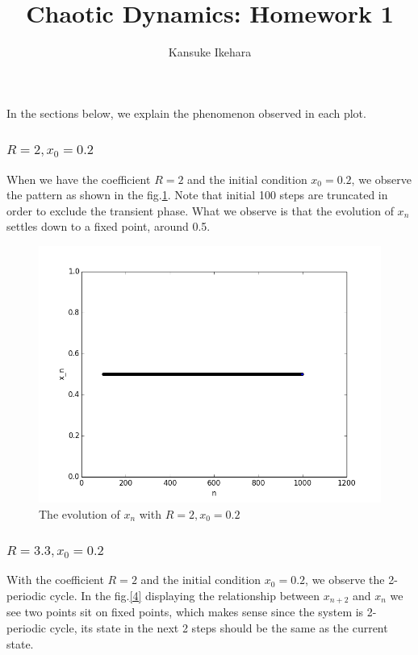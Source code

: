 \documentclass{article}
\title{Chaotic Dynamics: Homework 1}
\author{Kansuke Ikehara}
\begin{document}
\maketitle

In the sections below, we explain the phenomenon observed in each plot.
\subsubsection*{$R = 2, x_{0} = 0.2$}

When we have the coefficient $R = 2$ and the initial condition $x_{0} = 0.2$, we observe the pattern as shown in the fig.\ref{1}. Note that initial 100 steps are truncated in order to exclude the transient phase. What we observe is that the evolution of $x_{n}$ settles down to a fixed point, around 0.5.
\begin{figure}
	\centering
	\includegraphics[scale = 0.4]{figs/R2_x0_02_fig1.png}
	\caption{The evolution of $x_{n}$ with $R = 2, x_{0} = 0.2$}
	\label{1}
\end{figure}

\subsubsection*{$R = 3.3, x_{0} = 0.2$}
With the coefficient $R = 2$ and the initial condition $x_{0} = 0.2$, we observe the 2-periodic cycle. In the fig.\ref{4} displaying the relationship between $x_{n+2}$ and $x_{n}$ we see two points sit on fixed points, which makes sense since the system is 2-periodic cycle, its state in the next 2 steps should be the same as the current state.
\end{document}
